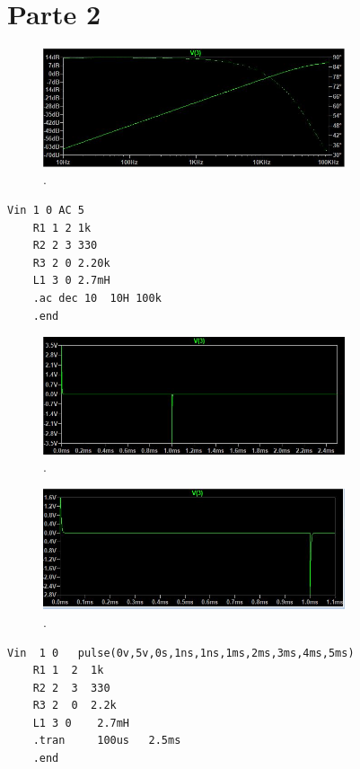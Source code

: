 \documentclass[12pt]{report}
\begin{document}
\section{Parte 2}
\begin{figure}[h!]
  \centering
    \includegraphics[width=3.5in]{ac}
  \caption{.}
\end{figure}
\begin{lstlisting}[frame=single]
    Vin 1 0 AC 5
    R1 1 2 1k
    R2 2 3 330
    R3 2 0 2.20k
    L1 3 0 2.7mH
    .ac dec 10  10H 100k
    .end

\end{lstlisting}
\begin{figure}[h!]
  \centering
    \includegraphics[width=3.5in]{pulse}
  \caption{.}
\end{figure}
\begin{figure}[h!]
  \centering
    \includegraphics[width=3.5in]{pulse2}
  \caption{.}
\end{figure}
\begin{lstlisting}[frame=single]
    Vin  1 0   pulse(0v,5v,0s,1ns,1ns,1ms,2ms,3ms,4ms,5ms) 
    R1 1  2  1k
    R2 2  3  330
    R3 2  0  2.2k
    L1 3 0    2.7mH
    .tran     100us   2.5ms
    .end
\end{lstlisting}
\end{document}
